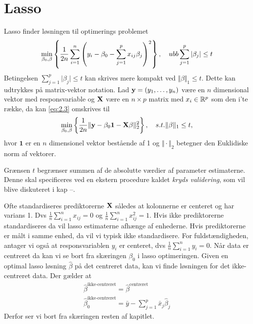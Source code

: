\section{Lasso}
Lasso finder løsningen til optimerings problemet
\begin{align}
\min_{\beta_0, \beta} \cbr{\frac{1}{2n} \sum_{i=1}^n \del{y_i - \beta_0 - \sum_{j=1}^p x_{ij} \beta_j}^2}, \quad ubb \sum_{j=1}^p \vert \beta_j \vert \leq t \label{eq:2.3}
\end{align}
Betingelsen $\sum_{j=1}^p \vert \beta_j \vert \leq t$ kan skrives mere kompakt ved $\Vert \beta \Vert_1 \leq t$.
Dette kan udtrykkes på matrix-vektor notation.
Lad \(\mathbf{y}=(y_1, \ldots, y_n)\) være en \(n\) dimensional vektor med responsvariable og \(\mathbf{X}\) være en $n \times p$ matrix med $x_i \in \mathbb{R}^p$ som den i'te række, da kan \eqref{eq:2.3} omskrives til
\begin{align*}
\min_{\beta_0, \beta} \cbr{\frac{1}{2n} \Vert \y - \beta_0 \mathbf{1} - \X \beta \Vert_2^2}, \quad s.t. \Vert \beta \Vert_1 \leq t,
\end{align*}
hvor \(\mathbf{1}\) er en \(n\) dimensionel vektor bestående af 1 og \(\Vert \cdot \Vert_2\) betegner den Euklidiske norm af vektorer.

Grænsen \(t\) begrænser summen af de absolutte værdier af parameter estimaterne.
Denne skal specificeres ved en ekstern procedure kaldet \textit{kryds validering}, som vil blive diskuteret i kap --.

Ofte standardiseres prediktorerne \(\mathbf{X}\) således at kolonnerne er centeret og har varians 1. Dvs \(\frac{1}{n} \sum_{i=1}^n x_{ij} = 0\) og \(\frac{1}{n} \sum_{i=1}^n x_{ij}^2=1\). Hvis ikke prediktorerne standardiseres da vil lasso estimaterne afhænge af enhederne.
Hvis prediktorerne er målt i samme enhed, da vil vi typisk ikke standardisere.
For fuldstændigheden, antager vi også at responsvariablen $y_i$ er centeret, dvs \(\frac{1}{n} \sum_{i=1}^n y_{i} = 0\).
Når data er centreret da kan vi se bort fra skæringen $\beta_0$ i lasso optimeringen.
Given en optimal lasso løsning \(\hat{\beta}\) på det centreret data, kan vi finde løsningen for det ikke-centreret data. Der gælder at
\begin{align*}
\hat{\beta}^{\text{ikke-centreret}} = \hat{\beta}^{\text{centreret}} \\
\hat{\beta}_0^{\text{ikke-centreret}} = \bar{y} - \sum_{j=1}^p \bar{x}_j \hat{\beta}_j
\end{align*}
Derfor ser vi bort fra skæringen resten af kapitlet.

